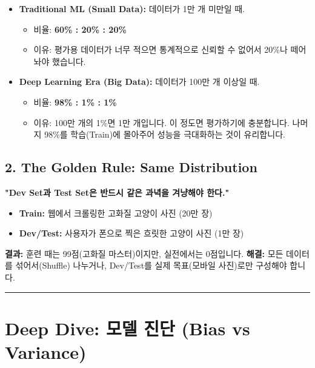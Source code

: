 \documentclass[11pt,a4paper]{book}
\theoremstyle{definition}
\begin{document}
\begin{itemize}
    \item \textbf{Traditional ML (Small Data):} 데이터가 1만 개 미만일 때.
    \begin{itemize}
        \item 비율: \textbf{60\% : 20\% : 20\%}
        \item 이유: 평가용 데이터가 너무 적으면 통계적으로 신뢰할 수 없어서 20\%나 떼어놔야 했습니다.
    \end{itemize}
    
    \item \textbf{Deep Learning Era (Big Data):} 데이터가 100만 개 이상일 때.
    \begin{itemize}
        \item 비율: \textbf{98\% : 1\% : 1\%}
        \item 이유: 100만 개의 1\%면 1만 개입니다. 이 정도면 평가하기에 충분합니다. 나머지 98\%를 학습(Train)에 몰아주어 성능을 극대화하는 것이 유리합니다.
    \end{itemize}
\end{itemize}


\subsection{2. The Golden Rule: Same Distribution}
\textbf{"Dev Set과 Test Set은 반드시 같은 과녁을 겨냥해야 한다."}

\begin{warningbox}[title={나쁜 예시 (Bad Example)}]
\begin{itemize}
    \item \textbf{Train:} 웹에서 크롤링한 고화질 고양이 사진 (20만 장)
    \item \textbf{Dev/Test:} 사용자가 폰으로 찍은 흐릿한 고양이 사진 (1만 장)
\end{itemize}
\textbf{결과:} 훈련 때는 99점(고화질 마스터)이지만, 실전에서는 0점입니다.
\textbf{해결:} 모든 데이터를 섞어서(Shuffle) 나누거나, Dev/Test를 실제 목표(모바일 사진)로만 구성해야 합니다.
\end{warningbox}

\vspace{0.5cm}\hrule\vspace{0.5cm}

\section{Deep Dive: 모델 진단 (Bias vs Variance)}
\end{document}

